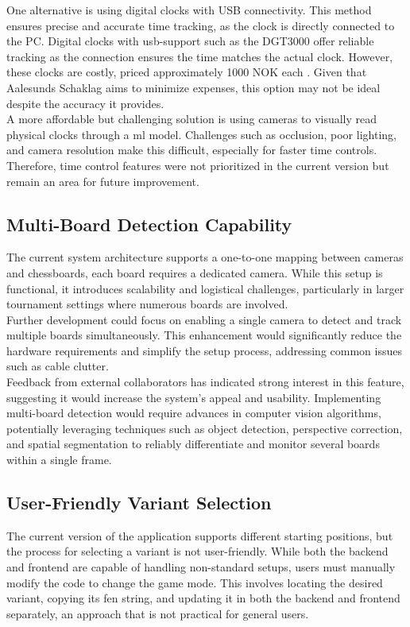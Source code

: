 One alternative is using digital clocks with USB connectivity. This method ensures precise and accurate time tracking, as the clock is directly connected to the PC. Digital clocks with \gls{usb}-support such as the DGT3000 offer reliable tracking as the connection ensures the time matches the actual clock. However, these clocks are costly, priced approximately 1000 NOK each \cite{sjakkbutikken:dgt-clock}. Given that Aalesunds Schaklag aims to minimize expenses, this option may not be ideal despite the accuracy it provides. \\

A more affordable but challenging solution is using cameras to visually read physical clocks through a \gls{ml} model. Challenges such as occlusion, poor lighting, and camera resolution make this difficult, especially for faster time controls. \\

Therefore, time control features were not prioritized in the current version but remain an area for future improvement.

\subsection{Multi-Board Detection Capability}
The current system architecture supports a one-to-one mapping between cameras and chessboards, each board requires a dedicated camera. While this setup is functional, it introduces scalability and logistical challenges, particularly in larger tournament settings where numerous boards are involved. \\

Further development could focus on enabling a single camera to detect and track multiple boards simultaneously. This enhancement would significantly reduce the hardware requirements and simplify the setup process, addressing common issues such as cable clutter. \\

Feedback from external collaborators has indicated strong interest in this feature, suggesting it would increase the system's appeal and usability. Implementing multi-board detection would require advances in computer vision algorithms, potentially leveraging techniques such as object detection, perspective correction, and spatial segmentation to reliably differentiate and monitor several boards within a single frame.

\subsection{User-Friendly Variant Selection}
The current version of the application supports different starting positions, but the process for selecting a variant is not user-friendly. While both the backend and frontend are capable of handling non-standard setups, users must manually modify the code to change the game mode. This involves locating the desired variant, copying its \gls{fen} string, and updating it in both the backend and frontend separately, an approach that is not practical for general users. \\

